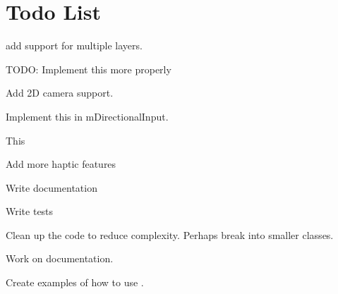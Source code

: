 \chapter{Todo List}
\hypertarget{todo}{}\label{todo}

\begin{DoxyRefList}
\item[Member \doxylink{class_atlas_1_1abstract_a7f6e5dc79241315ff8753e3ea3fbf3d2}{Atlas\+::abstract\texorpdfstring{$<$}{<} Console\+Sink \texorpdfstring{$>$}{>}\+::depth} ]\label{todo__todo000008}%
%
add support for multiple layers.  
\item[Member \doxylink{namespace_atlas_afa2a252b78c0821fed0a608c60cfd2f0}{Atlas\+::Default\+Physics\+Trace} (const char \texorpdfstring{$\ast$}{*}in\+FMT,...)]\label{todo__todo000009}%
%
TODO\+: Implement this more properly  
\item[Class \doxylink{class_atlas_1_1_game_camera}{Atlas\+::Game\+Camera} ]\label{todo__todo000011}%
%
Add 2D camera support.  
\item[Class \doxylink{class_atlas_1_1_game_camera_1_1_directional_input}{Atlas\+::Game\+Camera\+::Directional\+Input} ]\label{todo__todo000012}%
%
Implement this in m\+Directional\+Input.  
\item[Class \doxylink{class_atlas_1_1_localization_registry}{Atlas\+::Localization\+Registry} ]\label{todo__todo000007}%
%
This  
\item[File \doxylink{_common_8h}{Common.h} ]\label{todo__todo000001}%
%
Add more haptic features 
\item[File \doxylink{_file_system_registry_8h}{File\+System\+Registry.h} ]\label{todo__todo000004}%
%
Write documentation 



Write tests 



Clean up the code to reduce complexity. Perhaps break into smaller classes.  
\item[File \doxylink{_game_camera_8h}{Game\+Camera.h} ]\label{todo__todo000010}%
%
Work on documentation.  
\item[File \doxylink{_input_8h}{Input.h} ]\label{todo__todo000006}%
%
Create examples of how to use . 




\end{DoxyRefList}

